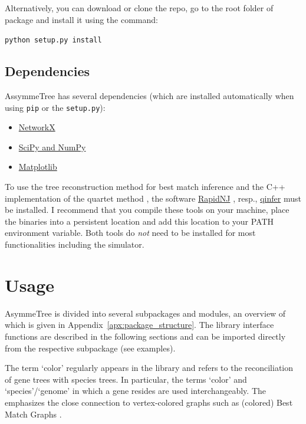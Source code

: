\documentclass[hidelinks,11pt]{article}
\newcommand{\COMMANDLINE}[1]{\begingroup\par\vspace{3mm}\color{darkgrey}\begin{adjustwidth}{1cm}{1cm}\texttt{#1}\end{adjustwidth}\vspace{3mm}\endgroup}
\begin{document}
Alternatively, you can download or clone the repo, go to the root folder of package and install it using the command:

\COMMANDLINE{python setup.py install}


\subsection{Dependencies}

AssymmeTree has several dependencies (which are installed automatically when using \texttt{pip} or the \texttt{setup.py}):

\begin{itemize}
	\item \href{https://networkx.github.io}{NetworkX}
	\item \href{http://www.scipy.org/install.html}{SciPy and NumPy}
	\item \href{https://matplotlib.org/}{Matplotlib}
\end{itemize}

To use the tree reconstruction method for best match inference and the C++ implementation of the quartet method \citep{stadler2020}, the software \href{https://birc.au.dk/software/rapidnj/}{RapidNJ} \citep{simonsen2008}, resp., \href{https://github.com/david-schaller/qinfer}{qinfer} must be installed.
I recommend that you compile these tools on your machine, place the binaries into a persistent location and add this location to your PATH environment variable.
Both tools do \emph{not} need to be installed for most functionalities including the simulator.



\section{Usage}

AsymmeTree is divided into several subpackages and modules, an overview of which is given in Appendix~\ref{apx:package_structure}.
The library interface functions are described in the following sections and can be imported directly from the respective subpackage (see examples).

The term `color' regularly appears in the library and refers to the reconciliation of gene trees with species trees.
In particular, the terms `color' and `species'/`genome' in which a gene resides are used interchangeably.
The emphasizes the close connection to vertex-colored graphs such as (colored) Best Match Graphs \citep{geiss2019a}.
\end{document}
